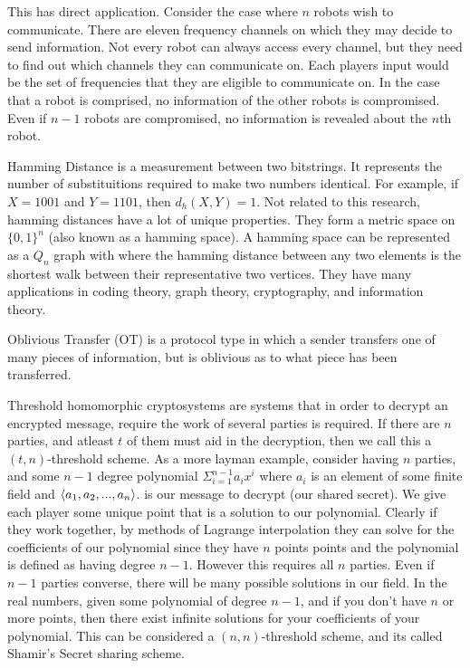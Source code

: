 \documentclass[10pt]{article}
\begin{document}
This has direct application. Consider the case where $n$ robots wish to communicate. There are eleven frequency channels on which they may decide to send information. Not every robot can always access every channel, but they need to find out which channels they can communicate on. Each players input would be the set of frequencies that they are eligible to communicate on. In the case that a robot is comprised, no information of the other robots is compromised. Even if $n-1$ robots are compromised, no information is revealed about the $n$th robot.

Hamming Distance is a measurement between two bitstrings. It represents the number of substituitions required to make two numbers identical. For example, if $X = 1001$ and $Y = 1101$, then $d_h(X,Y) = 1$. Not related to this research, hamming distances have a lot of unique properties. They form a metric space on $\{0,1\}^n$ (also known as a hamming space). A hamming space can be represented as a $Q_n$ graph with where the hamming distance between any two elements is the shortest walk between their representative two vertices. They have many applications in coding theory, graph theory, cryptography, and information theory.

Oblivious Transfer (OT) is a protocol type in which a sender transfers one of many pieces of information, but is oblivious as to what piece has been transferred.

Threshold homomorphic cryptosystems are systems that in order to decrypt an encrypted message, require the work of several parties is required. If there are $n$ parties, and atleast $t$ of them must aid in the decryption, then we call this a $(t,n)$-threshold scheme. As a more layman example, consider having $n$ parties, and some $n-1$ degree polynomial $\Sigma_{i=1}^{n-1} a_i x^i$ where $a_i$ is an element of some finite field and $\braket{a_1,a_2,...,a_n}$. is our message to decrypt (our shared secret). We give each player some unique point that is a solution to  our polynomial. Clearly if they work together, by methods of Lagrange interpolation they can solve for the coefficients of our polynomial since they have $n$ points points and the polynomial is defined as having degree $n-1$. However this requires all $n$ parties. Even if $n-1$ parties converse, there will be many possible solutions in our field. In the real numbers, given some polynomial of degree $n-1$, and if you don't have $n$ or more points, then there exist infinite solutions for your coefficients of your polynomial. This can be considered a $(n,n)$-threshold scheme, and its called Shamir's Secret sharing scheme.\cite{shamir}
\end{document}
